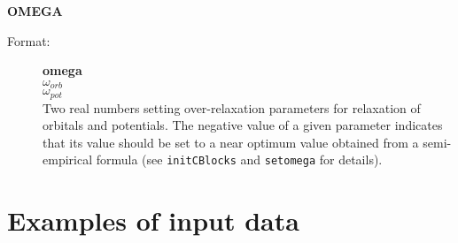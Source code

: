 \documentclass[12pt,a4paper]{article}
\newcommand{\ft}[1]{\texttt{#1}}
\begin{document}
\begin{description}
\item \textbf{OMEGA}
\begin{description}
\item[Format:] \textbf{omega} \\
\hspace*{0.9cm}$\omega_{orb}$ \\
\hspace*{0.9cm}$\omega_{pot}$ \\ Two real numbers setting
over-relaxation parameters for relaxation of orbitals and potentials.
The negative value of a given parameter indicates that its value
should be set to a near optimum value obtained from a semi-empirical
formula (see \ft{initCBlocks} and \ft{setomega} for details).
\end{description}

\end{description}


\newpage

\section{Examples of input data}
\end{document}
